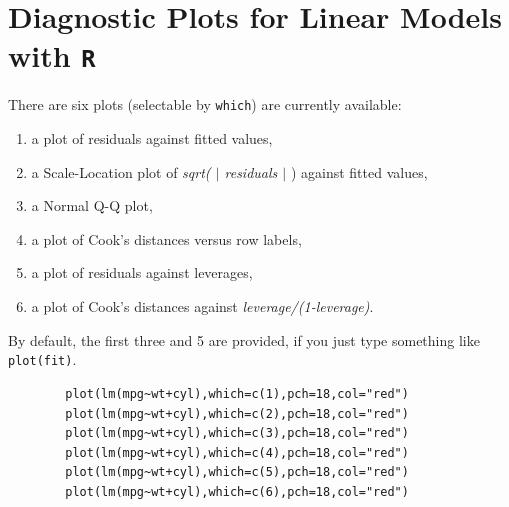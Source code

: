 \documentclass[residuals.tex]{subfiles}
\begin{document}
	\Large
	\bigskip
	\section{Diagnostic Plots for Linear Models with \texttt{R}}
	
	There are six plots (selectable by \texttt{which}) are currently available: 
	\begin{enumerate}
		\item a plot of residuals against fitted values, 
		\item a Scale-Location plot of \textit{sqrt( $|$ residuals $|$ }) against fitted values, 
		\item a Normal Q-Q plot, 
		\item a plot of Cook's distances versus row labels, 
		\item a plot of residuals against leverages, 
		\item a plot of Cook's distances against \textit{leverage/(1-leverage)}.
	\end{enumerate} 
	
	\noindent By default, the first three and 5 are provided, if you just type something like \texttt{plot(fit)}.
	\bigskip
	\begin{framed}
		\begin{verbatim}
		plot(lm(mpg~wt+cyl),which=c(1),pch=18,col="red")
		plot(lm(mpg~wt+cyl),which=c(2),pch=18,col="red")
		plot(lm(mpg~wt+cyl),which=c(3),pch=18,col="red")
		plot(lm(mpg~wt+cyl),which=c(4),pch=18,col="red")
		plot(lm(mpg~wt+cyl),which=c(5),pch=18,col="red")
		plot(lm(mpg~wt+cyl),which=c(6),pch=18,col="red")
		\end{verbatim}
	\end{framed}
	
\end{document}

